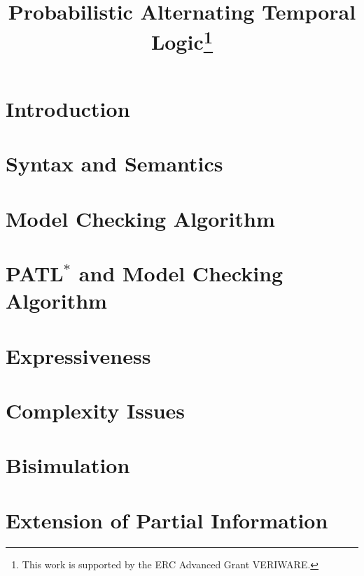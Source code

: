 \documentclass{llncs}
\begin{document}
\title{Probabilistic Alternating Temporal Logic\thanks{This work is supported by
the ERC Advanced Grant VERIWARE.}}

\author{}
\email{}

\maketitle

\begin{abstract}

\end{abstract}

\section{Introduction}

\section{Syntax and Semantics}

\section{Model Checking Algorithm}

\section{PATL$^*$ and Model Checking Algorithm}

\section{Expressiveness}

\section{Complexity Issues}

\section{Bisimulation}

\section{Extension of Partial Information}
\end{document}
